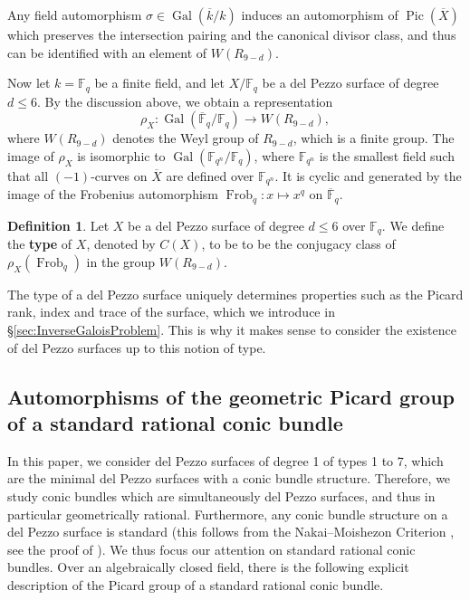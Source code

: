 \documentclass[a4paper, 11pt, reqno]{amsart}
\numberwithin{equation}{section} \numberwithin{figure}{section}
\newcommand{\term}[1]{\textbf{#1}}          %
\DeclareMathOperator{\Pic}{Pic}
\DeclareMathOperator{\Gal}{Gal}
\DeclareMathOperator{\Frob}{Frob}
\def \F {{\mathbb F}}
\newcommand{\ra}{\rightarrow}
\theoremstyle{definition}
\newtheorem{definition}[lemma]{Definition}
\numberwithin{lemma}{section}
\begin{document}
Any field automorphism $\sigma \in \Gal(\overline{k} /k)$ induces an automorphism of $\Pic(\overline{X})$ which preserves the intersection pairing and the canonical divisor class, and thus can be identified with an element of $W(R_{9-d})$. 

Now let $k = \F_q$ be a finite field, and let $X/\F_q$ be a del Pezzo surface of degree $d \leq 6$. By the discussion above, we obtain a representation
\begin{equation}\label{eq:GaloisrepdP}
    \rho_X \colon \Gal(\overline{\F}_q /\F_q) \ra W(R_{9-d}),
\end{equation}
where $W(R_{9-d})$ denotes the Weyl group of $R_{9-d}$, which is a finite group. The image of $\rho_X$ is isomorphic to $\Gal(\F_{q^n}/\F_q)$, where $\F_{q^n}$ is the smallest field such that all $(-1)$-curves on $\overline{X}$ are defined over $\F_{q^n}$. It is cyclic and generated by the image of the Frobenius automorphism $\Frob_q \colon x \mapsto x^q$ on $\overline{\F}_q$.

\begin{definition}
    Let $X$ be a del Pezzo surface of degree $d \leq 6$ over $\F_q$. We define the \term{type} of $X$, denoted by $C(X)$, to be to be the conjugacy class of $\rho_X(\Frob_q)$ in the group $W(R_{9-d})$.
\end{definition}

The type of a del Pezzo surface uniquely determines properties such as the Picard rank, index and trace of the surface, which we introduce in \S\ref{sec:InverseGaloisProblem}. This is why it makes sense to consider the existence of del Pezzo surfaces up to this notion of type.

\subsection{Automorphisms of the geometric Picard group of a standard rational conic bundle}\label{sec:autpicconicbundle}

In this paper, we consider del Pezzo surfaces of degree 1 of types 1 to 7, which are the minimal del Pezzo surfaces with a conic bundle structure. Therefore, we study conic bundles which are simultaneously del Pezzo surfaces, and thus in particular geometrically rational. Furthermore, any conic bundle structure on a del Pezzo surface is standard (this follows from the Nakai--Moishezon Criterion \cite[V, Theorem 1.10]{hartshorne}, see the proof of \cite[Lemma 5.1]{FLS}). We thus focus our attention on standard rational conic bundles. Over an algebraically closed field, there is the following explicit description of the Picard group of a standard rational conic bundle. 
\end{document}
